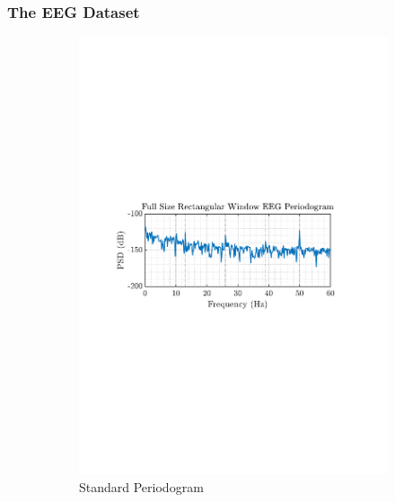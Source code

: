 \documentclass[12pt]{article}
\begin{document}
	\subsubsection{The EEG Dataset}
	
	\begin{figure}[H]
		\centering
		\begin{subfigure}{0.49\textwidth}
			\centering
			\includegraphics[trim={2.2cm 11.2cm 3.15cm  11.2cm}, clip, width=\textwidth]{../MATLAB/figures/q1_2b_fig01.pdf} 
			\captionsetup{justification=centering}
			\caption{Standard Periodogram}
		\end{subfigure}
		\begin{subfigure}{0.49\textwidth}
			\centering

\end{subfigure}
\end{figure}
\end{document}

